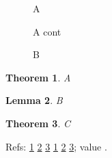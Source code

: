 \documentclass{article}
\newtheorem{thm}{Theorem}
\newtheorem{lem}[thm]{Lemma}
\begin{document}
\begin{figure}\caption{A}\label{fa}\end{figure}
\begin{figure}\ContinuedFloat\caption{A cont}\label{fb}\end{figure}
\begin{figure}\caption{B}\label{fc}\end{figure}
\begin{thm}\label{t1}A\end{thm}
\begin{lem}\label{l1}B\end{lem}
\begin{thm}\label{t2}C\end{thm}
Refs: \ref{fa} \ref{fb} \ref{fc} \ref{t1} \ref{l1} \ref{t2}; value \the\value{figure}.
\end{document}
